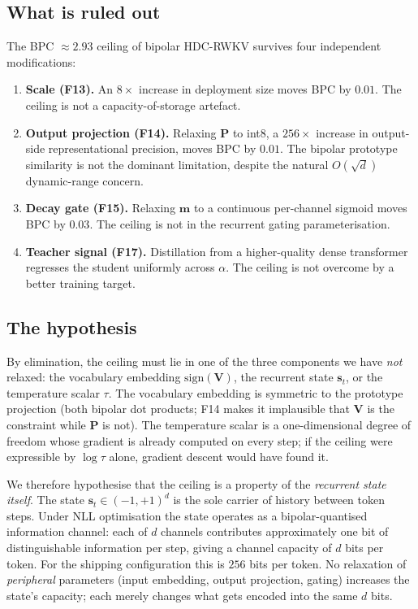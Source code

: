 \documentclass[runningheads]{llncs}
\newcommand{\bV}{\mathbf{V}}
\newcommand{\bP}{\mathbf{P}}
\newcommand{\bm}{\mathbf{m}}
\newcommand{\bs}{\mathbf{s}}
\begin{document}
\subsection{What is ruled out}

The BPC ${\approx}2.93$ ceiling of bipolar HDC-RWKV survives four
independent modifications:

\begin{enumerate}
  \item \textbf{Scale (F13).} An $8\times$ increase in deployment size
        moves BPC by $0.01$. The ceiling is not a capacity-of-storage
        artefact.
  \item \textbf{Output projection (F14).} Relaxing $\bP$ to int8, a
        $256\times$ increase in output-side representational
        precision, moves BPC by $0.01$. The bipolar prototype
        similarity is not the dominant limitation, despite the
        natural $O(\sqrt{d})$ dynamic-range concern.
  \item \textbf{Decay gate (F15).} Relaxing $\bm$ to a continuous
        per-channel sigmoid moves BPC by $0.03$. The ceiling is not
        in the recurrent gating parameterisation.
  \item \textbf{Teacher signal (F17).} Distillation from a
        higher-quality dense transformer regresses the student
        uniformly across $\alpha$. The ceiling is not overcome by
        a better training target.
\end{enumerate}

\subsection{The hypothesis}

By elimination, the ceiling must lie in one of the three components
we have \emph{not} relaxed: the vocabulary embedding
$\mathrm{sign}(\bV)$, the recurrent state $\bs_t$, or the temperature
scalar $\tau$. The vocabulary embedding is symmetric to the prototype
projection (both bipolar dot products; F14 makes it implausible that
$\bV$ is the constraint while $\bP$ is not). The temperature scalar
is a one-dimensional degree of freedom whose gradient is already
computed on every step; if the ceiling were expressible by
$\log\tau$ alone, gradient descent would have found it.

We therefore hypothesise that the ceiling is a property of the
\emph{recurrent state itself}. The state $\bs_t \in (-1,+1)^d$ is
the sole carrier of history between token steps. Under NLL
optimisation the state operates as a bipolar-quantised information
channel: each of $d$ channels contributes approximately one bit of
distinguishable information per step, giving a channel capacity of
$d$ bits per token. For the shipping configuration this is $256$
bits per token. No relaxation of \emph{peripheral} parameters (input
embedding, output projection, gating) increases the state's
capacity; each merely changes what gets encoded into the same $d$
bits.
\end{document}

